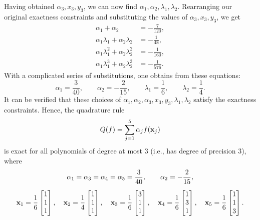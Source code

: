 \documentclass{homework}
\begin{document}
\begin{alphaparts}
		Having obtained $\alpha_3, x_3, y_3$, we can now find $\alpha_1,\alpha_2,\lambda_1,\lambda_2$. Rearranging our original exactness constraints and substituting the values of $\alpha_3, x_3,y_3$, we get
		\begin{align*}
			\alpha_1 + \alpha_2 &= -\frac{7}{120}, \\
			\alpha_1\lambda_1 + \alpha_2\lambda_2 &= -\frac{1}{48}, \\
			\alpha_1\lambda_1^2 + \alpha_2\lambda_2^2 &= -\frac{1}{160}, \\
			\alpha_1\lambda_1^3 + \alpha_2\lambda_2^3 &= -\frac{1}{576}.
		\end{align*}
		With a complicated series of substitutions, one obtains from these equations:
		\begin{equation*}
			\alpha_1 = \frac{3}{40}, \qquad \alpha_2 = -\frac{2}{15}, \qquad \lambda_1 = \frac{1}{6}, \qquad \lambda_2 = \frac{1}{4}.
		\end{equation*}
		It can be verified that these choices of $\alpha_1,\alpha_2,\alpha_3,x_3,y_3,\lambda_1,\lambda_2$ satisfy the exactness constraints. Hence, the quadrature rule
		\begin{equation*}
			Q(f) = \sum_{j=1}^5\alpha_j f(\mathbf{x}_j)
		\end{equation*}
		is exact for all polynomials of degree at most 3 (i.e., has degree of precision 3), where
		\begin{gather*}
			\alpha_1 = \alpha_3=\alpha_4=\alpha_5 = \frac{3}{40}, \qquad \alpha_2 = -\frac{2}{15},\\[0.5em]
			\mathbf{x}_1 = \frac{1}{6}\left[\begin{matrix}1\\1\\1\end{matrix}\right], \quad\mathbf{x}_2 = \frac{1}{4}\left[\begin{matrix}1\\1\\1\end{matrix}\right],\quad \mathbf{x}_3 = \frac{1}{6}\left[\begin{matrix}3\\1\\1\end{matrix}\right], \quad \mathbf{x}_4 = \frac{1}{6}\left[\begin{matrix}1\\3\\1\end{matrix}\right], \quad \mathbf{x}_5 = \frac{1}{6}\left[\begin{matrix}1\\1\\3\end{matrix}\right].
		\end{gather*}
		

\end{alphaparts}
\end{document}
